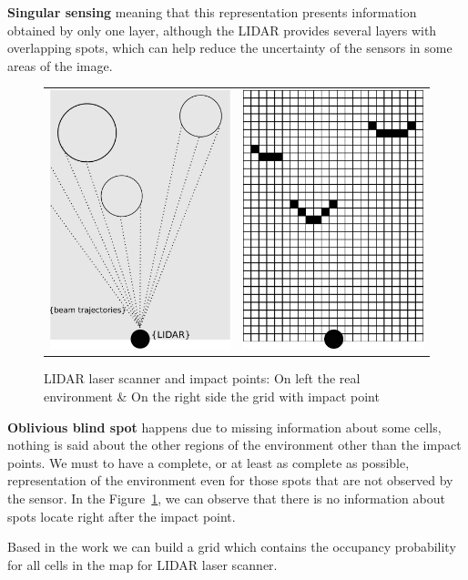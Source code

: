 \textbf{Singular sensing} meaning that this representation presents information obtained by only one layer, although the LIDAR provides several layers with overlapping spots, which can help reduce the uncertainty of the sensors in some areas of the image. 

\begin{figure}[h]
   \centering
     \begin{tabular}{lr}
       \includegraphics[width=0.3\columnwidth]{img/fig:motion:impactpoint:01}
       & \includegraphics[width=0.3\columnwidth]{img/fig:motion:impactpoint:02}
     \end{tabular}
   \caption{LIDAR laser scanner and impact points: On left the real environment \& On the right side the grid with impact point}
   \label{fig:motion:impactpoint}
 \end{figure}


\textbf{Oblivious blind spot} happens due to missing information about some cells, nothing is said about the other regions of the environment other than the impact points. We must to have a complete, or at least as complete as possible, representation of the environment even for those spots that are not observed by the sensor. In the Figure~\ref{fig:motion:impactpoint}, we can observe that there is no information about spots locate right after the impact point.

Based in the work \cite{ADARVE-2012-671211} we can build a grid which contains the occupancy probability for all cells in the map for LIDAR laser scanner.

